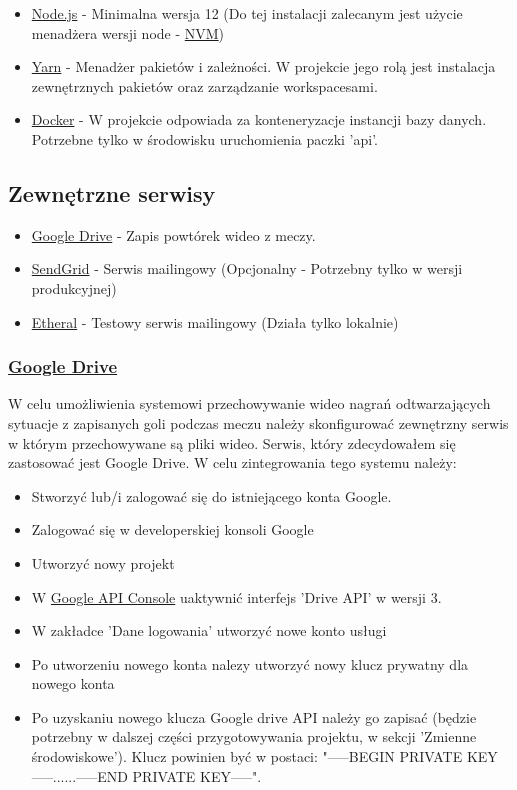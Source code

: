 \begin{itemize}
	\item \href{https://nodejs.org/en/}{Node.js} - Minimalna wersja 12 (Do tej instalacji zalecanym jest użycie menadżera wersji node - \href{https://github.com/nvm-sh/nvm}{NVM})
	\item \href{https://yarnpkg.com/}{Yarn} - Menadżer pakietów i zależności. W projekcie jego rolą jest instalacja zewnętrznych pakietów oraz zarządzanie workspacesami.
	\item \href{https://www.docker.com/}{Docker} - W projekcie odpowiada za konteneryzacje instancji bazy danych. Potrzebne tylko w środowisku uruchomienia paczki 'api'.
\end{itemize}

\subsection{Zewnętrzne serwisy}

\begin{itemize}
	\item \href{https://nodejs.org/en/}{Google Drive} - Zapis powtórek wideo z meczy.
	\item \href{https://sendgrid.com/}{SendGrid} - Serwis mailingowy (Opcjonalny - Potrzebny tylko w wersji produkcyjnej)
	\item \href{https://ethereal.email/}{Etheral} - Testowy serwis mailingowy (Działa tylko lokalnie)
\end{itemize}

\subsubsection{\href{https://developers.google.com/drive/api/v3/enable-drive-api}{Google Drive}}

W celu umożliwienia systemowi przechowywanie wideo nagrań odtwarzających sytuacje z zapisanych goli podczas meczu należy skonfigurować zewnętrzny serwis w którym przechowywane są pliki wideo. Serwis, który zdecydowałem się zastosować jest Google Drive. W celu zintegrowania tego systemu należy:

\begin{itemize}
	\item Stworzyć lub/i zalogować się do istniejącego konta Google.
	\item Zalogować się w developerskiej konsoli Google
	\item Utworzyć nowy projekt
	\item W \href{https://developers.google.com/drive/api/v3/enable-drive-api}{Google API Console} uaktywnić interfejs 'Drive API' w wersji 3.
	\item W zakładce 'Dane logowania' utworzyć nowe konto usługi
	\item Po utworzeniu nowego konta nalezy utworzyć nowy klucz prywatny dla nowego konta
  \item Po uzyskaniu nowego klucza Google drive API należy go zapisać  (będzie potrzebny w dalszej części przygotowywania projektu, w sekcji 'Zmienne środowiskowe'). Klucz powinien być w postaci: \newline "-----BEGIN PRIVATE KEY-----......-----END PRIVATE KEY-----".
\end{itemize}


